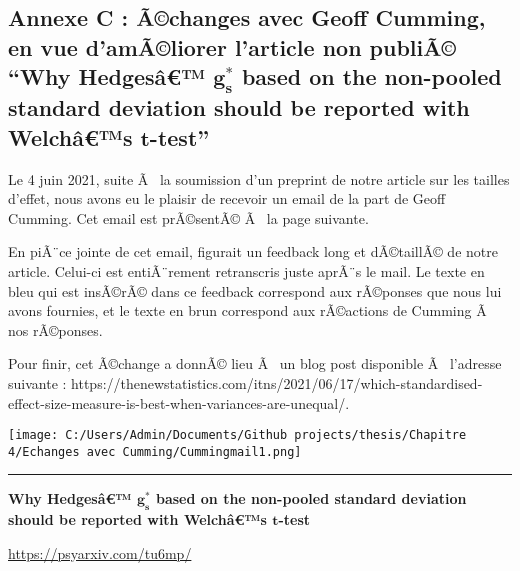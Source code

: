 \begin{appendix}
\newpage

\hypertarget{annexe-c-uxe3changes-avec-geoff-cumming-en-vue-damuxe3liorer-larticle-non-publiuxe3-why-hedgesuxe2-bmg_s-based-on-the-non-pooled-standard-deviation-should-be-reported-with-welchuxe2s-bmt-test}{%
\subsection{\texorpdfstring{Annexe C : Ã©changes avec Geoff Cumming, en
vue d'amÃ©liorer l'article non publiÃ© ``Why Hedgesâ€™ \(\bm{g_s^*}\)
based on the non-pooled standard deviation should be reported with
Welchâ€™s
\(\bm{t}\)-test''}{Annexe C : Ã©changes avec Geoff Cumming, en vue d'amÃ©liorer l'article non publiÃ© ``Why Hedgesâ€™ \textbackslash bm\{g\_s\^{}*\} based on the non-pooled standard deviation should be reported with Welchâ€™s \textbackslash bm\{t\}-test''}}\label{annexe-c-uxe3changes-avec-geoff-cumming-en-vue-damuxe3liorer-larticle-non-publiuxe3-why-hedgesuxe2-bmg_s-based-on-the-non-pooled-standard-deviation-should-be-reported-with-welchuxe2s-bmt-test}}

Le 4 juin 2021, suite Ã~ la soumission d'un preprint de notre article
sur les tailles d'effet, nous avons eu le plaisir de recevoir un email
de la part de Geoff Cumming. Cet email est prÃ©sentÃ© Ã~ la page
suivante.

En piÃ¨ce jointe de cet email, figurait un feedback long et dÃ©taillÃ©
de notre article. Celui-ci est entiÃ¨rement retranscris juste aprÃ¨s le
mail. Le texte en bleu qui est insÃ©rÃ© dans ce feedback correspond aux
rÃ©ponses que nous lui avons fournies, et le texte en brun correspond
aux rÃ©actions de Cumming Ã~ nos rÃ©ponses.

Pour finir, cet Ã©change a donnÃ© lieu Ã~ un blog post disponible Ã~
l'adresse suivante :
https://thenewstatistics.com/itns/2021/06/17/which-standardised-effect-size-measure-is-best-when-variances-are-unequal/.

\texttt{[image: C:/Users/Admin/Documents/Github projects/thesis/Chapitre 4/Echanges avec Cumming/Cummingmail1.png]}
\newpage

\begin{center}\rule{0.5\linewidth}{0.5pt}\end{center}

\color{black}\textbf{Why Hedgesâ€™ \(\bm{g_s^*}\) based on the
non-pooled standard deviation should be reported with Welchâ€™s
\(\bm{t}\)-test}

\underline{https://psyarxiv.com/tu6mp/}


\end{appendix}
